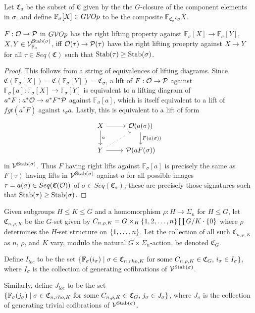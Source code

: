 \documentclass[psamsfonts,onesided,10pt,letterpaper]{amsart}%
\renewcommand{\C}{\ensuremath{\mathfrak{C}}}
\newcommand{\FF}{\ensuremath{\mathbb{F}}}
\renewcommand{\P}{\ensuremath{\mathcal{P}}}
\newcommand{\Vsigma}{\ensuremath{\V^{\Stab(\sigma)}_{\F_\sigma}}}
\begin{document}
Let $\C_\sigma$ be the subset of $\C$ given by the the $G$-closure of the component elements in $\sigma$, and define $\FF_\sigma[X]\in G\V Op$ to be the composite $\FF_{\C_\sigma}\iota_\sigma X$.

\begin{lemma}[c.f. \cite{CM1} 1.16]
  $F: \O \to \P$ in $G\mathcal V Op$ has the right lifting property against $\FF_\sigma[X]\to \FF_\sigma[Y]$, $X,Y\in\Vsigma$, {\sc iff} $\O(\tau)\to\P(\tau)$ have the right lifting proeprty against $X\to Y$ for all $\tau\in Seq(\C)$ such that $\mathrm{Stab}(\tau)\geq \mathrm{Stab}(\sigma)$.  
\end{lemma}
\begin{proof}
  This follows from a string of equivalences of lifting diagrams. Since $\C(\FF_\sigma[X]) = \C(\FF_\sigma[Y])= \C_\sigma$, a lift of $F:\O\to \P$ against $\FF_\sigma[a]: \FF_\sigma[X]\to\FF_\sigma[Y]$ is equivalent to a lifting diagram of $a^*F: a^*\O \to a^*F^*\P$ against $\FF_\sigma[a]$, which is itself equivalent to a lift of $fgt(a^*F)$ against $\iota_\sigma a$. Lastly, this is equivalent to a lift of form
\[
\begin{tikzcd}
  X \arrow[r] \arrow[d,"a"] & \O(a(\sigma)) \arrow[d, "F(a(\sigma))"] \\
  Y \arrow[r] \arrow[ur, dotted] & \P(aF(\sigma))
\end{tikzcd}
\]
in $\mathcal V^{\mathrm{Stab}(\sigma)}$. Thus $F$ having right lifts against $\FF_\sigma[a]$ is precisely the same as $F(\tau)$ having lifts in $\mathcal V^{\mathrm{Stab}(\sigma)}$ against $a$ for all possible images $\tau = a(\sigma)\in Seq(\C(\O))$ of $\sigma\in Seq(\C_\sigma)$; these are precisely those signatures such that $\mathrm{Stab}(\tau)\geq \mathrm{Stab}(\sigma)$. 
\end{proof}

Given subgroups $H\leq K \leq G$ and a homomorphism $\rho: H\to \Sigma_n$ for $H\leq G$, let $\C_{n,\rho,K}$ be the $G$-set given by $C_{n,\rho,K} = G\times_H\left\{1,2,\ldots, n\right\} \coprod G/K\cdot \left\{0\right\}$ where $\rho$ determines the $H$-set structure on $\left\{1,\ldots, n\right\}$. Let the collection of all such $\C_{n,\rho,K}$ as $n$, $\rho$, and $K$ vary, modulo the natural $G\times \Sigma_n$-action, be denoted $\C_G$.

Define $I_{loc}$ to be the set $\sets{\FF_\sigma(i_\sigma)}{\mbox{$\sigma\in\C_{n,rho,K}$ for some $C_{n,\rho,K}\in \C_G$, $i_\sigma\in I_\sigma$}}$, where $I_\sigma$ is the collection of generating cofibrations of $\mathcal V^{\mathrm{Stab}(\sigma)}$.

Similarly, define $J_{loc}$ to be the set $\sets{\FF_\sigma(j_\sigma)}{\mbox{$\sigma\in\C_{n,rho,K}$ for some $C_{n,\rho,K}\in \C_G$, $j_\sigma\in J_\sigma$}}$, where $J_\sigma$ is the collection of generating trivial cofibrations of $\mathcal V^{\mathrm{Stab}(\sigma)}$. 
\end{document}
